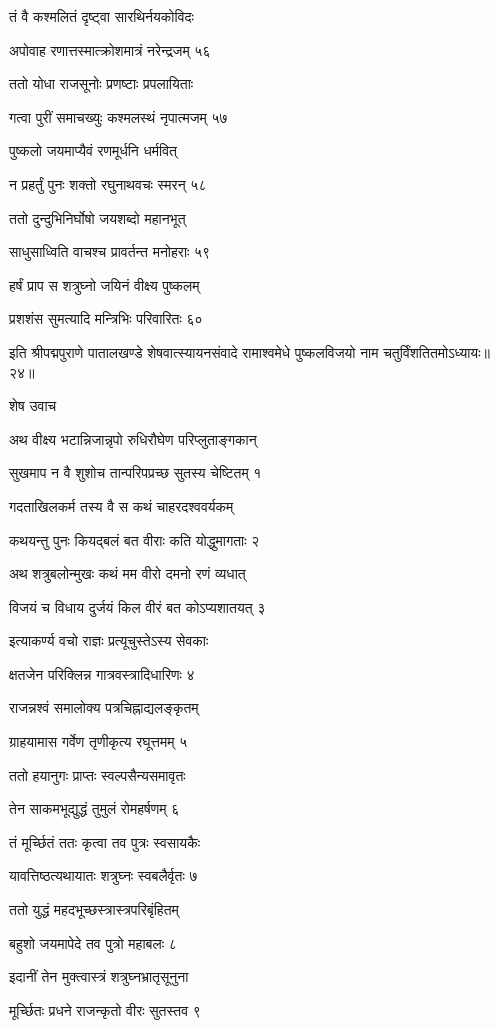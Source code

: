 तं वै कश्मलितं दृष्ट्वा सारथिर्नयकोविदः

अपोवाह रणात्तस्मात्क्रोशमात्रं नरेन्द्रजम् ५६

ततो योधा राजसूनोः प्रणष्टाः प्रपलायिताः

गत्वा पुरीं समाचख्युः कश्मलस्थं नृपात्मजम् ५७

पुष्कलो जयमाप्यैवं रणमूर्धनि धर्मवित्

न प्रहर्तुं पुनः शक्तो रघुनाथवचः स्मरन् ५८

ततो दुन्दुभिनिर्घोषो जयशब्दो महानभूत्

साधुसाध्विति वाचश्च प्रावर्तन्त मनोहराः ५९

हर्षं प्राप स शत्रुघ्नो जयिनं वीक्ष्य पुष्कलम्

प्रशशंस सुमत्यादि मन्त्रिभिः परिवारितः ६०

इति श्रीपद्मपुराणे पातालखण्डे शेषवात्स्यायनसंवादे रामाश्वमेधे पुष्कलविजयो नाम चतुर्विंशतितमोऽध्यायः॥२४॥


शेष उवाच

अथ वीक्ष्य भटान्निजान्नृपो रुधिरौघेण परिप्लुताङ्गकान्

सुखमाप न वै शुशोच तान्परिपप्रच्छ सुतस्य चेष्टितम् १

गदताखिलकर्म तस्य वै स कथं चाहरदश्ववर्यकम्

कथयन्तु पुनः कियद्बलं बत वीराः कति योद्धुमागताः २

अथ शत्रुबलोन्मुखः कथं मम वीरो दमनो रणं व्यधात्

विजयं च विधाय दुर्जयं किल वीरं बत कोऽप्यशातयत् ३

इत्याकर्ण्य वचो राज्ञः प्रत्यूचुस्तेऽस्य सेवकाः

क्षतजेन परिक्लिन्न गात्रवस्त्रादिधारिणः ४

राजन्नश्वं समालोक्य पत्रचिह्नाद्यलङ्कृतम्

ग्राहयामास गर्वेण तृणीकृत्य रघूत्तमम् ५

ततो हयानुगः प्राप्तः स्वल्पसैन्यसमावृतः

तेन साकमभूद्युद्धं तुमुलं रोमहर्षणम् ६

तं मूर्च्छितं ततः कृत्वा तव पुत्रः स्वसायकैः

यावत्तिष्ठत्यथायातः शत्रुघ्नः स्वबलैर्वृतः ७

ततो युद्धं महदभूच्छस्त्रास्त्रपरिबृंहितम्

बहुशो जयमापेदे तव पुत्रो महाबलः ८

इदानीं तेन मुक्त्वास्त्रं शत्रुघ्नभ्रातृसूनुना

मूर्च्छितः प्रधने राजन्कृतो वीरः सुतस्तव ९

